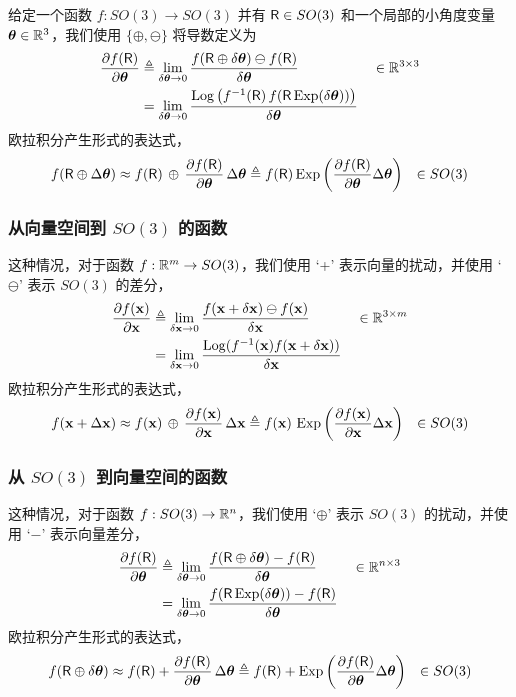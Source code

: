 给定一个函数 $f:SO(3) \to SO(3)$ 并有 $\mathsf R\in SO(3)$ 和一个局部的小角度变量 ${\bm \theta}\in{\mathbb R}^3$，我们使用 $\{\oplus,\ominus\}$ 将导数定义为
%
\begin{align}
\frac{\partial f(\mathsf R)}{\partial{\bm \theta}} 
&\triangleq \lim_{\delta{\bm \theta}\to0}\frac{f(\mathsf R\oplus\delta{\bm \theta})\ominus f(\mathsf R)}{\delta{\bm \theta}}  && \in {\mathbb R}^{3\times 3}\\
&= \lim_{\delta{\bm \theta}\to0}\frac{\operatorname*{Log}\big(f^{-1}(\mathsf R)\,f(\mathsf R\operatorname*{Exp}(\delta{\bm \theta}))\big)}{\delta{\bm \theta}} \label{equ:derivative_SO3}
\end{align}
%
欧拉积分产生形式的表达式，
%
\begin{align*}
f(\mathsf R\oplus\Delta{\bm \theta}) &\approx f(\mathsf R)\,\oplus\,\frac{\partial f(\mathsf R)}{\partial{\bm \theta}}\,\Delta{\bm \theta}
 \triangleq f(\mathsf R)\operatorname*{Exp}\left(\frac{\partial f(\mathsf R)}{\partial{\bm \theta}}\Delta{\bm \theta}\right)
 & \in SO(3)
\end{align*}




\subsubsection{从向量空间到 $SO(3)$ 的函数}

这种情况，对于函数 $f:{\mathbb R}^m\to SO(3)$，我们使用 `+' 表示向量的扰动，并使用 `$\ominus$' 表示 $SO(3)$ 的差分，
%
\begin{align}
\frac{\partial f({\bf x})}{\partial{\bf x}} &\triangleq \lim_{\delta{\bf x}\to0} \frac{ f({\bf x}+\delta{\bf x})\ominus f({\bf x})}{\delta{\bf x}} && \in {\mathbb R}^{3\times m} \label{equ:dif_RtoSO3}\\
&= \lim_{\delta{\bf x}\to0} \frac{\operatorname*{Log}(f^{-1}({\bf x}) f({\bf x}+\delta{\bf x}))}{\delta{\bf x}}
\end{align}
%
欧拉积分产生形式的表达式，
%
\begin{align*}
f({\bf x}+\Delta{\bf x}) &\approx f({\bf x})\,\oplus\,\frac{\partial f({\bf x})}{\partial{\bf x}}\,\Delta{\bf x}
 \triangleq f({\bf x})\,\operatorname*{Exp}\left(\frac{\partial f({\bf x})}{\partial{\bf x}}\Delta{\bf x}\right)
 & \in SO(3)
\end{align*}

\subsubsection{从 $SO(3)$ 到向量空间的函数}

这种情况，对于函数 $f: SO(3)\to{\mathbb R}^n$，我们使用 `$\oplus$' 表示 $SO(3)$ 的扰动，并使用 `$-$' 表示向量差分，
%
\begin{align}
\frac{\partial f(\mathsf R)}{\partial{\bm \theta}} &\triangleq \lim_{\delta{\bm \theta}\to0} \frac{f(\mathsf R\oplus\delta{\bm \theta}) - f(\mathsf R)}{\delta{\bm \theta}} && \in {\mathbb R}^{n\times 3} \label{equ:jacobian_SO3_Rn}\\
&= \lim_{\delta{\bm \theta}\to0} \frac{f(\mathsf R\operatorname*{Exp}(\delta{\bm \theta})) - f(\mathsf R)}{\delta{\bm \theta}}
\end{align}
%
欧拉积分产生形式的表达式，
%
\begin{align*}
f(\mathsf R\oplus\delta{\bm \theta}) &\approx f(\mathsf R)+\frac{\partial f(\mathsf R)}{\partial{\bm \theta}}\,\Delta{\bm \theta}
 \triangleq f(\mathsf R)+\operatorname*{Exp}\left(\frac{\partial f(\mathsf R)}{\partial{\bm \theta}}\Delta{\bm \theta}\right)
 & \in SO(3)
\end{align*}

